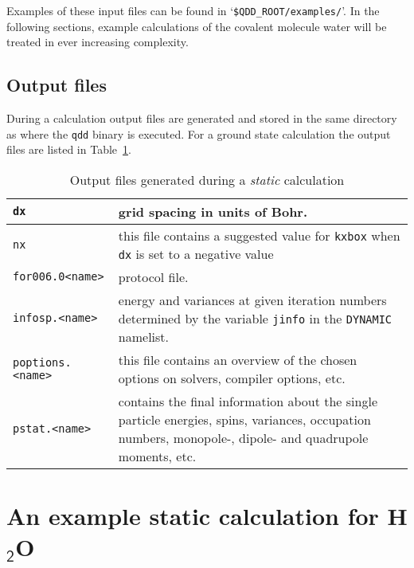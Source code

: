 \documentclass[11pt,a4paper]{article}
\begin{document}
		Examples of these input files can be found in `\texttt{\$QDD\_ROOT/examples/}'. In the following sections, example calculations of the covalent molecule water will be treated in ever increasing complexity.
			
		\subsection{Output files}
			During a calculation output files are generated and stored in the same directory as where the \texttt{qdd} binary is executed. For a ground state calculation the output files are listed in Table~\ref{tab:static-output-files}.
			\begin{table}[t]
				\caption{Output files generated during a \emph{static} calculation}\label{tab:static-output-files}
				\begin{tabular}{|p{3.5cm}|p{11.2cm}|}
					\hline
					\texttt{dx}& grid spacing in units of Bohr.\\
					\hline
					\texttt{nx}& this file contains a suggested value for \texttt{kxbox} when \texttt{dx} is set to a negative value\\
					\hline
					\texttt{for006.0<name>}& protocol file.\\
					\hline
					\texttt{infosp.<name>}& energy and variances at given iteration numbers determined by the variable \texttt{jinfo} in the \texttt{DYNAMIC} namelist.\\
					\hline
					\texttt{poptions.<name>}& this file contains an overview of the chosen options on solvers, compiler options, etc.\\
					\hline
					\texttt{pstat.<name>}& contains the final information about the single particle energies, spins, variances, occupation numbers, monopole-, dipole- and quadrupole moments, etc.\\
					\hline
				\end{tabular}
			\end{table}
		
	\section{An example static calculation for H$_\mathsf{2}$O}
			
\end{document}
